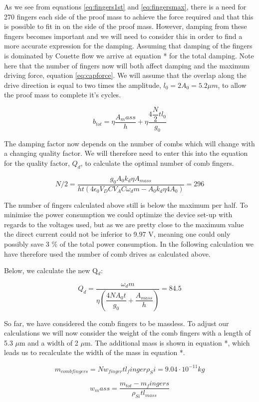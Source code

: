 \documentclass[12pt,a4paper,titlepage]{article}
\begin{document}
\begin{spacing}{1.1}
As we see from equations \ref{eq:fingers1st} and \ref{eq:fingersmax}, there is a need for 270 fingers each side of the proof mass to achieve the force required and that this is possible to fit in on the side of the proof mass. However, damping from these fingers becomes important and we will need to consider this in order to find a more accurate expression for the damping. Assuming that damping of the fingers is dominated by Couette flow we arrive at equation * for the total damping. Note here that the number of fingers now will both affect damping and the maximum driving force, equation \ref{eq:capforce}. We will assume that the overlap along the drive direction is equal to two times the amplitude, $l_0 = 2A_0 = 5.2 \mu m$, to allow the proof mass to complete it's cycles.

\begin{equation}
b_{tot} = \eta \dfrac{A_mass}{h} + \eta \dfrac{4 \dfrac{N}{2} t l_0}{g_0}
\label{eq:dampingwithcomb}
\end{equation}

The damping factor now depends on the number of combs which will change with a changing quality factor. We will therefore need to enter this into the equation for the quality factor, $Q_d$, to calculate the optimal number of comb fingers.

\begin{equation}
N/2 = \dfrac{g_0 A_0 k_d \eta A_{mass}}{ht(4 \epsilon_0 V_DC V_AC \omega_d m - A_0 k_d \eta 4 A_0)} = 296
\label{eq:comfingers2ndit}
\end{equation}

The number of fingers calculated above still is below the maximum per half. To minimise the power consumption we could optimize the device set-up with regards to the voltages used, but as we are pretty close to the maximum value the direct current could not be inferior to 9.97 V, meaning one could only possibly save 3 \% of the total power consumption. In the following calculation we have therefore used the number of comb drives as calculated above.

Below, we calculate the new Q$_d$:

\begin{equation}
Q_d = \dfrac{\omega_d m}{\eta \left(\dfrac{4N A_0t}{g_0} + \dfrac{A_{mass}}{h}\right)}= 84.5
\label{eq:qualityfactorit}
\end{equation}

So far, we have considered the comb fingers to be massless. To adjust our calculations we will now consider the weight of the comb fingers with a length of 5.3 $\mu$m and a width of 2 $\mu$m. The additional mass is shown in equation *, which leads us to recalculate the width of the mass in equation *.

\begin{equation}
m_{comb fingers} = N w_{finger} t l_finger \rho_Si = 9.04 \cdot 10^{-11} kg
\label{eq:masscombfingers}
\end{equation}

\begin{equation}
w_mass = \dfrac{m_{tot} - m_fingers}{\rho_{Si} t l_{mass}}
\label{eq:widthfinal}
\end{equation}






\end{spacing}
\printbibliography
\end{document}
